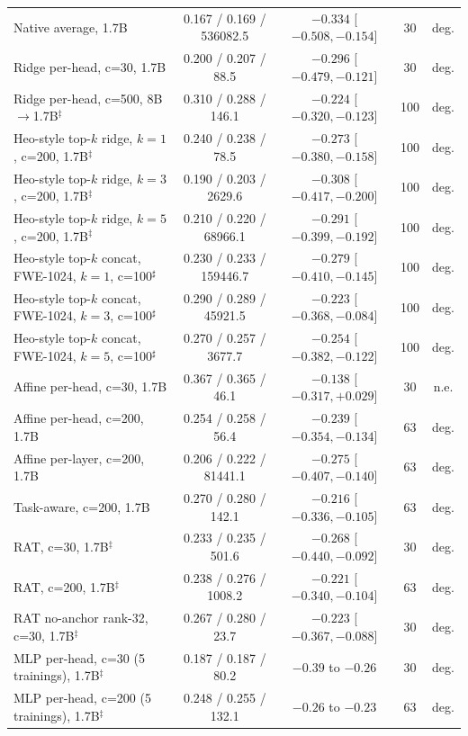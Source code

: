 \documentclass[10pt]{article}
\begin{document}
\begin{table}[t]
\begin{tabular}{lcccc}
Native average, 1.7B & 0.167 / 0.169 / 536082.5 & $-0.334$ [$-0.508, -0.154$] & 30 & deg. \\
Ridge per-head, c=30, 1.7B & 0.200 / 0.207 / 88.5 & $-0.296$ [$-0.479, -0.121$] & 30 & deg. \\
Ridge per-head, c=500, 8B$\to$1.7B$^\ddagger$ & 0.310 / 0.288 / 146.1 & $-0.224$ [$-0.320, -0.123$] & 100 & deg. \\
Heo-style top-$k$ ridge, $k{=}1$, c=200, 1.7B$^\ddagger$ & 0.240 / 0.238 / 78.5 & $-0.273$ [$-0.380, -0.158$] & 100 & deg. \\
Heo-style top-$k$ ridge, $k{=}3$, c=200, 1.7B$^\ddagger$ & 0.190 / 0.203 / 2629.6 & $-0.308$ [$-0.417, -0.200$] & 100 & deg. \\
Heo-style top-$k$ ridge, $k{=}5$, c=200, 1.7B$^\ddagger$ & 0.210 / 0.220 / 68966.1 & $-0.291$ [$-0.399, -0.192$] & 100 & deg. \\
Heo-style top-$k$ concat, FWE-1024, $k{=}1$, c=100$^{\sharp}$ & 0.230 / 0.233 / 159446.7 & $-0.279$ [$-0.410, -0.145$] & 100 & deg. \\
Heo-style top-$k$ concat, FWE-1024, $k{=}3$, c=100$^{\sharp}$ & 0.290 / 0.289 / 45921.5 & $-0.223$ [$-0.368, -0.084$] & 100 & deg. \\
Heo-style top-$k$ concat, FWE-1024, $k{=}5$, c=100$^{\sharp}$ & 0.270 / 0.257 / 3677.7 & $-0.254$ [$-0.382, -0.122$] & 100 & deg. \\
Affine per-head, c=30, 1.7B & 0.367 / 0.365 / 46.1 & $-0.138$ [$-0.317, +0.029$] & 30 & n.e. \\
Affine per-head, c=200, 1.7B & 0.254 / 0.258 / 56.4 & $-0.239$ [$-0.354, -0.134$] & 63 & deg. \\
Affine per-layer, c=200, 1.7B & 0.206 / 0.222 / 81441.1 & $-0.275$ [$-0.407, -0.140$] & 63 & deg. \\
Task-aware, c=200, 1.7B & 0.270 / 0.280 / 142.1 & $-0.216$ [$-0.336, -0.105$] & 63 & deg. \\
RAT, c=30, 1.7B$^\ddagger$ & 0.233 / 0.235 / 501.6 & $-0.268$ [$-0.440, -0.092$] & 30 & deg. \\
RAT, c=200, 1.7B$^\ddagger$ & 0.238 / 0.276 / 1008.2 & $-0.221$ [$-0.340, -0.104$] & 63 & deg. \\
RAT no-anchor rank-32, c=30, 1.7B$^\ddagger$ & 0.267 / 0.280 / 23.7 & $-0.223$ [$-0.367, -0.088$] & 30 & deg. \\
MLP per-head, c=30 (5 trainings), 1.7B$^\ddagger$ & 0.187 / 0.187 / 80.2 & $-0.39$ to $-0.26$ & 30 & deg. \\
MLP per-head, c=200 (5 trainings), 1.7B$^\ddagger$ & 0.248 / 0.255 / 132.1 & $-0.26$ to $-0.23$ & 63 & deg. \\

\end{tabular}
\end{table}
\end{document}

